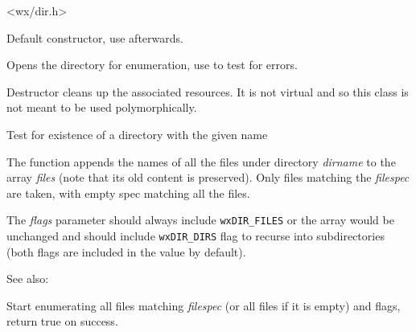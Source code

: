 
<wx/dir.h>


\label{wxdirwxdir}


Default constructor, use  afterwards.


Opens the directory for enumeration, use  
to test for errors.


\label{wxdirdtor}


Destructor cleans up the associated resources. It is not virtual and so this
class is not meant to be used polymorphically.


\label{wxdirexists}


Test for existence of a directory with the given name


\label{wxdirgetallfiles}


The function appends the names of all the files under directory {\it dirname} 
to the array {\it files} (note that its old content is preserved). Only files
matching the {\it filespec} are taken, with empty spec matching all the files.

The {\it flags} parameter should always include {\tt wxDIR\_FILES} or the array
would be unchanged and should include {\tt wxDIR\_DIRS} flag to recurse into
subdirectories (both flags are included in the value by default).

See also: 


\label{wxdirgetfirst}


Start enumerating all files matching {\it filespec} (or all files if it is
empty) and flags, return true on success.


